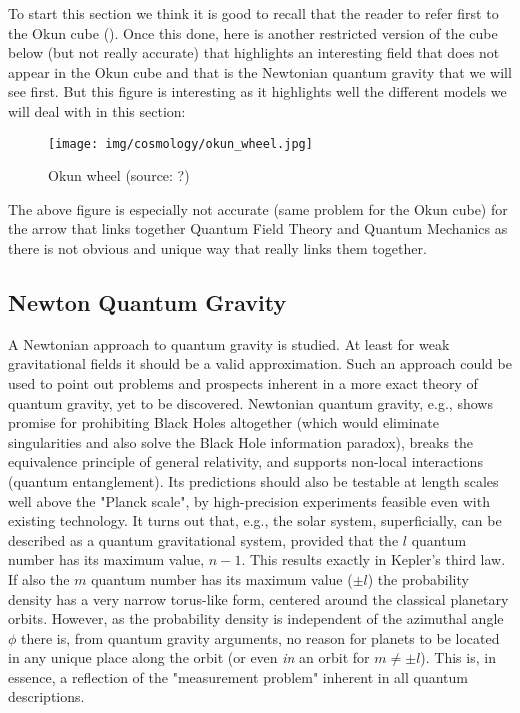 	To start this section we think it is good to recall that the reader to refer first to the Okun cube (). Once this done, here is another restricted version of the cube below (but not really accurate)  that highlights an interesting field that does not appear in the Okun cube and that is the Newtonian quantum gravity that we will see first. But this figure is interesting as it highlights well the different models we will deal with in this section:
	\begin{figure}[H]
		\centering
		\texttt{[image: img/cosmology/okun\_wheel.jpg]}	
		\caption[Okun wheel]{Okun wheel (source: ?)}
	\end{figure}
	\begin{tcolorbox}[title=Remark,colframe=black,arc=10pt]
	The above figure is especially not accurate (same problem for the Okun cube) for the arrow that links together Quantum Field Theory and Quantum Mechanics as there is not obvious and unique way that really links them together.
	\end{tcolorbox}
	
	\subsection{Newton Quantum Gravity}\label{newton quantum gravity}
	A Newtonian approach to quantum gravity is studied. At least for weak gravitational fields it should be a valid approximation. Such an approach could be used to point out problems and prospects 	inherent in a more exact theory of quantum gravity, yet to be discovered. Newtonian quantum gravity, e.g., shows promise for prohibiting Black Holes altogether (which would eliminate singularities and also solve the Black Hole information paradox), breaks the equivalence principle of general relativity, and 	supports non-local interactions (quantum entanglement). Its predictions should also be testable at length scales well above the "Planck scale", by high-precision experiments feasible even with existing technology. It turns out that, e.g., the solar system, superficially, can be described as a quantum gravitational system, provided that the $l$ quantum number has its maximum value, $n-1$. This results exactly in Kepler's third law. If also the $m$ quantum number has its maximum value ($\pm l$) the 	probability density has a very narrow torus-like form, centered around the classical planetary orbits. However, as the probability density is independent of the azimuthal angle $\phi$ there is, from quantum gravity arguments, no reason for planets to be located in any unique place along the orbit (or even \textit{in} an orbit for $m \neq \pm l$). This is, in essence, a reflection of the "measurement problem" inherent in all quantum descriptions.
	
